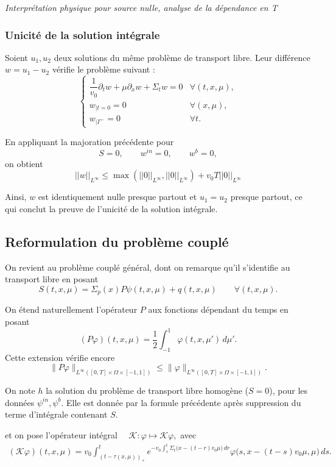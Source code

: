 \documentclass{article}
\begin{document}
\textit{Interprétation physique pour source nulle, analyse de la dépendance en T}


\subsubsection{Unicité de la solution intégrale}

Soient $u_1,u_2$ deux solutions du même problème de transport libre. Leur différence \(w=u_1-u_2\) vérifie le problème suivant :
\[
\begin{cases}
    \dfrac1{v_0}\partial_t w + \mu\partial_x w + \Sigma_t w = 0 &\forall(t,x,\mu), \\
    w_{|t=0} = 0  & \forall(x,\mu), \\
    w_{|\Gamma^-} = 0  &  \forall t.
\end{cases}
\]

En appliquant la majoration précédente pour
\[ S=0, \qquad w^{in}=0, \qquad w^b=0, \]
on obtient
\[
||w||_{L^\infty}
\leq
\max\left(||0||_{L^\infty},||0||_{L^\infty}\right)
+ v_0T||0||_{L^\infty}
\]

Ainsi, $w$ est identiquement nulle presque partout et \(u_1=u_2\) presque partout, ce qui conclut la preuve de l’unicité de la solution intégrale.

\subsection{Reformulation du problème couplé}

On revient au problème couplé général, dont on remarque qu’il s’identifie au transport libre en posant
\[
S(t,x,\mu) =\Sigma_p(x)P\psi(t,x,\mu)+q(t,x,\mu)
\qquad \forall(t,x,\mu).
\]

On étend naturellement l'opérateur $P$ aux fonctions dépendant du temps en posant
\[
(P\varphi)(t,x,\mu) = \frac12 \int_{-1}^1\varphi(t,x,\mu')\,d\mu'.
\]
Cette extension vérifie encore
\[
\|P\varphi\|_{L^\infty([0,T]\times\Omega\times[-1,1])}
\leq\|\varphi\|_{L^\infty([0,T]\times\Omega\times[-1,1])}.
\]

On note $h$ la solution du problème de transport libre homogène ($S=0$), pour les données $\psi^{in},\psi^b$. Elle est donnée par la formule précédente après suppression du terme d'intégrale contenant $S$.

et on pose l’opérateur intégral \(\quad \mathcal K:\varphi\longmapsto\mathcal K\varphi,\)
avec
\[
\begin{aligned}
    (\mathcal K\varphi)(t,x,\mu) = 
    v_0 \int_{(t-\tau(x,\mu))_+}^{t}
    e^{-v_0\int_s^t\Sigma_t\bigl(x-(t-r)v_0\mu\bigr)\,dr}
    \varphi\bigl(s,x-(t-s)v_0\mu,\mu\bigr)\,ds.
\end{aligned}
\]
\end{document}
